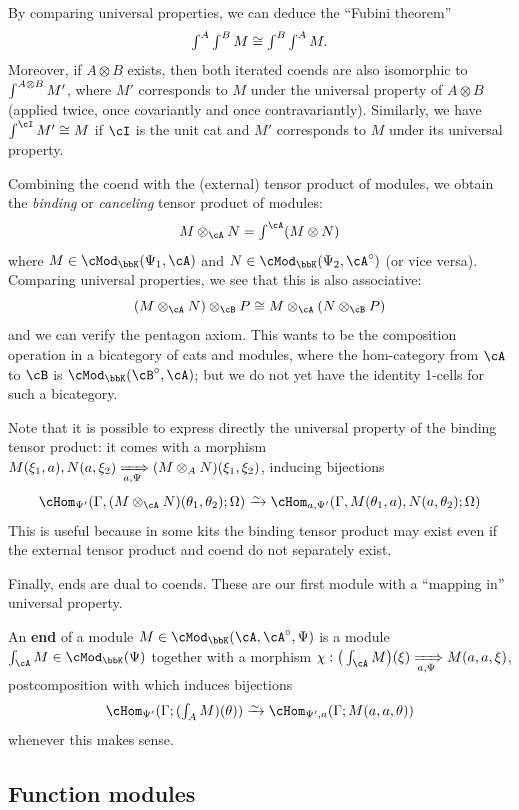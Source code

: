 \documentclass{amsart}
\newcommand{\A}{\cA}
\newcommand{\B}{\cB}
\newcommand{\I}{\cI}
\newcommand{\K}{\bbK}
\let\mod\cMod
\def\modk{\mod_\K}
\renewcommand{\o}{^{\circ}}
\def\mtoo#1{\xRightarrow[#1]{}}
\def\mhomv#1#2#3{\cHom_{#1}(#2;#3)}
\newcommand{\coend}{\begingroup\textstyle\int\endgroup}
\newcommand{\tend}{\begingroup\textstyle\int\endgroup}
\begin{document}
By comparing universal properties, we can deduce the ``Fubini theorem''
\[ \coend^A \coend^B M \cong \coend^B \coend^A M. \]
Moreover, if $A\otimes B$ exists, then both iterated coends are also isomorphic to $\coend^{A\otimes B} M'$, where $M'$ corresponds to $M$ under the universal property of $A\otimes B$ (applied twice, once covariantly and once contravariantly).
Similarly, we have $\coend^\I M'\cong M$ if $\I$ is the unit cat and $M'$ corresponds to $M$ under its universal property.

Combining the coend with the (external) tensor product of modules, we obtain the \emph{binding} or \emph{canceling} tensor product of modules:
\[ M\otimes_\A N = \coend^\A (M\otimes N) \]
where $M\in\modk(\Psi_1,\A)$ and $N\in\modk(\Psi_2,\A\o)$ (or vice versa).
Comparing universal properties, we see that this is also associative:
\[ (M\otimes_\A N) \otimes_\B P \cong M\otimes_\A (N\otimes_\B P) \]
and we can verify the pentagon axiom.
This wants to be the composition operation in a bicategory of cats and modules, where the hom-category from $\A$ to $\B$ is $\modk(\B\o,\A)$; but we do not yet have the identity 1-cells for such a bicategory.

Note that it is possible to express directly the universal property of the binding tensor product: it comes with a morphism $M(\xi_1,a), N(a,\xi_2) \mtoo{a,\Psi} (M\otimes_A N)(\xi_1,\xi_2)$, inducing bijections
\[ \mhomv{\Psi'}{\Gamma,(M\otimes_\A N) (\theta_1,\theta_2)}{\Omega} \toiso \mhomv{a,\Psi'}{\Gamma,M(\theta_1,a),N(a,\theta_2)}{\Omega} \]
This is useful because in some kits the binding tensor product may exist even if the external tensor product and coend do not separately exist.

Finally, ends are dual to coends.
These are our first module with a ``mapping in'' universal property.

\begin{defn}
  An \textbf{end} of a module $M\in \modk(\A,\A\o,\Psi)$ is a module $\tend_\A M\in\modk(\Psi)$ together with a morphism $\chi: {\big(\tend_\A M\big)(\xi)} \mtoo{a,\Psi} {M(a,a,\xi)}$, postcomposition with which induces bijections
  \[ \mhomv{\Psi'}{\Gamma}{(\tend_A M)(\theta)} \toiso \mhomv{\Psi',a}{\Gamma}{M(a,a,\theta)} \]
  whenever this makes sense.
\end{defn}


\subsection{Function modules}
\label{sec:func-mod}
\end{document}
